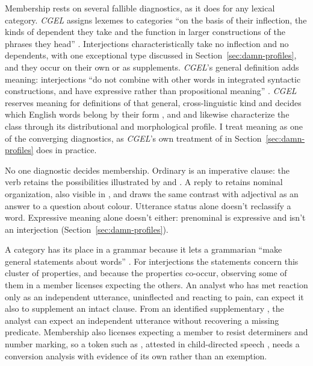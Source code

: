 \documentclass[12pt]{article}
\begin{document}
Membership rests on several fallible diagnostics, as it does for any
lexical category. \textit{CGEL} assigns lexemes to categories \enquote{on
the basis of their inflection, the kinds of dependent they take and the
function in larger constructions of the phrases they head}
\citep[30]{HuddlestonPullum2002}. Interjections characteristically take no
inflection \citep[106]{ameka1992} and no dependents, with one exceptional
type discussed in Section~\ref{sec:damn-profiles}, and they occur on their
own or as supplements. \textit{CGEL}'s general definition adds meaning:
interjections \enquote{do not combine with other words in integrated
syntactic constructions, and have expressive rather than propositional
meaning} \citep[1361]{HuddlestonPullum2002}. \textit{CGEL} reserves meaning
for definitions of that general, cross-linguistic kind and decides which
English words belong by their form \citep[31--32]{HuddlestonPullum2002},
and \textcite[105--106]{ameka1992} and \textcite[124--125]{wilkins1992}
likewise characterize the class through its distributional and
morphological profile. I treat meaning as one of the converging diagnostics,
as \textit{CGEL}'s own treatment of  in
Section~\ref{sec:damn-profiles} does in practice.

No one diagnostic decides membership. Ordinary  is an
imperative clause: the verb retains the possibilities illustrated by
 and . A reply 
to  retains nominal organization, also
visible in , and \textcite[124--125]{wilkins1992}
draws the same contrast with adjectival  as an answer to a
question about colour. Utterance status alone doesn't reclassify a word.
Expressive meaning alone doesn't either: prenominal  is
expressive and isn't an interjection (Section~\ref{sec:damn-profiles}).

A category has its place in a grammar because it lets a grammarian
\enquote{make general statements about words} \citep[30]{HuddlestonPullum2002}.
For interjections the statements concern this cluster of properties, and
because the properties co-occur, observing some of them in a member
licenses expecting the others. An analyst who has met reaction
 only as an independent utterance, uninflected and reacting
to pain, can expect it also to supplement an intact clause. From an
identified supplementary , the analyst can expect an
independent utterance without recovering a missing predicate. Membership
also licenses expecting a member to resist determiners and number marking,
so a token such as , attested in child-directed
speech \citep[36]{stange2016}, needs a conversion analysis with evidence of
its own rather than an exemption.
\end{document}
